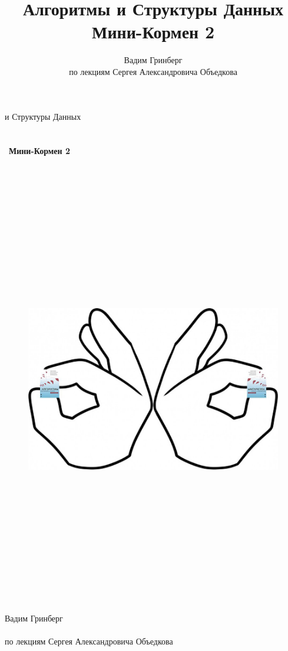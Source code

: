 \documentclass[a4paper,12pt]{article}
\title{\Huge{Алгоритмы и Структуры Данных \\ Мини-Кормен 2}}
\author{Вадим Гринберг\\по лекциям Сергея Александровича Объедкова}
\date{}
\begin{document}
\begin{titlepage}
  \begin{center}
  
  	{ и Структуры Данных}
	\\ \
	\\ \
	\\ \
	{\Huge \textbf{Мини-Кормен 2}}
    \\ \
    \\ \
    
    \begin{figure}[h]
    \begin{center}
        \begin{minipage}[h]{\linewidth}
        \includegraphics[height=18cm, width=\linewidth]{mini-kormen-2.jpg}
        \end{minipage}
    \end{center}
    \end{figure}
    \ \\
    
    {\Large Вадим Гринберг}\\\ \\
    {\large по лекциям Сергея Александровича Объедкова}
   
\end{center}
\end{titlepage}
 
\end{document}

